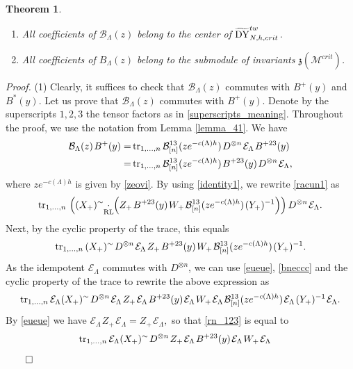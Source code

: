 \documentclass[12pt,a4paper,reqno]{amsart}
\theoremstyle{stil}
\newtheorem{thm}{Theorem}[section]
\theoremstyle{defi}
\theoremstyle{defi}
\theoremstyle{stil}
\theoremstyle{stil}
\theoremstyle{stil}
\theoremstyle{prim}
\newenvironment{prf}{\noindent \textit{Proof.}}{\null\hfill$\qed$\hskip
2mm\vskip 2mm}
\newcommand{\non}{\nonumber}
\newcommand{\beq}{\begin{equation}}
\newcommand{\eeq}{\end{equation}}
\newcommand{\ot}{\otimes}
\newcommand{\ts}{\hspace{1pt}}
\newcommand{\dyhocritt}{\widetilde{{\rm DY}}_{N,h,crit}^{tw} }
\newcommand{\Mccrit}{\mathcal{M}^{crit} }
\newcommand{\Ec}{\mathcal{E}}
\newcommand{\tr}{ {\rm tr}}
\newcommand{\bc}{\mathcal{B}}
\newcommand{\cdotrl}{\mathop{\hspace{-2pt}\underset{\text{RL}}{\cdot}\hspace{-2pt}}}
\begin{document}
\begin{thm}\label{thm_41}
\begin{enumerate}
\item  All coefficients of   $\mathcal{B}_\Lambda(z)$ belong to the center of   $\dyhocritt$.
\item All coefficients of   $B_\Lambda(z)$ belong to the submodule of invariants $\mathfrak{z}(\Mccrit)$.
\end{enumerate}
\end{thm}

\begin{prf}
(1) 
Clearly, it suffices to check that $\mathcal{B}_\Lambda(z)$ commutes with $B^+(y)$ and $B^*(y)$.
Let us prove that $\mathcal{B}_\Lambda(z)$ commutes with $B^+(y)$. 
Denote by the superscripts $1,2,3$   the tensor factors as in \eqref{superscripts_meaning}. Throughout the proof, we use the notation from Lemma \ref{lemma_41}.
We have
\begin{align}
\mathcal{B}_\Lambda(z)\ts B^+(y) = &\,
\tr_{1,\ldots ,n} \, \mathcal{B}^{ 13}_{[n]}(ze^{-c(\Lambda)h}) \ts D^{\ot n}\ts \Ec_\Lambda\ts B^{+23}(y)\non\\
=&\,\tr_{1,\ldots ,n} \, \mathcal{B}^{ 13}_{[n]}(ze^{-c(\Lambda)h}) \ts B^{+23}(y)\ts D^{\ot n}\ts \Ec_\Lambda,\label{racun1}
\end{align}
where $ze^{-c(\Lambda)h}$ is given by \eqref{zeovi}. 
By using \eqref{identity1}, we rewrite \eqref{racun1} as
$$
 \tr_{1,\ldots ,n} \,
\left((X_+)^\sim\cdotrl\left(
Z_+\ts
B^{+23}(y)\ts 
W_+\ts 
\bc_{[n]}^{13}(ze^{-c(\Lambda)h})\ts (Y_+)^{-1}\right)\right)  D^{\ot n}\ts \Ec_\Lambda.
$$
Next, by the cyclic property of the trace, this equals
$$
 \tr_{1,\ldots ,n} \,
 (X_+)^\sim \ts D^{\ot n}\ts \Ec_\Lambda  \ts
Z_+\ts
B^{+23}(y)\ts 
W_+\ts 
\bc_{[n]}^{13}(ze^{-c(\Lambda)h})\ts (Y_+)^{-1}  .
$$
As the idempotent $ \Ec_\Lambda$ commutes with $D^{\ot n}$, we can use \eqref{eueue}, \eqref{bneccc} and the cyclic property of the trace to rewrite the above expression as
\beq\label{rn_123}
 \tr_{1,\ldots ,n} \,
  \Ec_\Lambda (X_+)^\sim \ts D^{\ot n}\ts \Ec_\Lambda  \ts
Z_+\ts \Ec_\Lambda \ts
B^{+23}(y)\ts \Ec_\Lambda\ts 
W_+\ts \Ec_\Lambda\ts 
\bc_{[n]}^{13}(ze^{-c(\Lambda)h})\ts \Ec_\Lambda\ts (Y_+)^{-1}  \ts \Ec_\Lambda.
\eeq
By  \eqref{eueue} we have
$ 
\Ec_\Lambda  \ts
Z_+\ts \Ec_\Lambda
=
Z_+\ts \Ec_\Lambda,
$ 
so that \eqref{rn_123} is equal to
\begin{align*}
&\tr_{1,\ldots ,n} \,
  \Ec_\Lambda (X_+)^\sim \ts D^{\ot n}\ts  
Z_+\ts \Ec_\Lambda \ts
B^{+23}(y)\ts \Ec_\Lambda\ts 
W_+\ts \Ec_\Lambda\ts 

\end{align*}
\end{prf}
\end{document}
